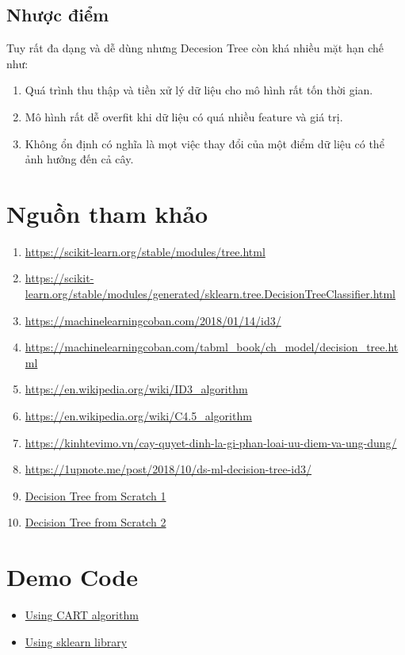 \documentclass[12pt, a4paper]{article}
\begin{document}
\subsection{Nhược điểm}
Tuy rất đa dạng và dễ dùng nhưng Decesion Tree còn khá nhiều mặt hạn chế như:
\begin{enumerate}
    \item Quá trình thu thập và tiền xử lý dữ liệu cho mô hình rất tốn thời gian.
    \item Mô hình rất dễ overfit khi dữ liệu có quá nhiều feature và giá trị.
    \item Không ổn định có nghĩa là mọt việc thay đổi của một điểm dữ liệu có thể ảnh hưởng đến cả cây.

\end{enumerate}
\newpage
\section*{Nguồn tham khảo}
\begin{enumerate}
    \item \url{https://scikit-learn.org/stable/modules/tree.html}
    \item \url{https://scikit-learn.org/stable/modules/generated/sklearn.tree.DecisionTreeClassifier.html}
    \item \url{https://machinelearningcoban.com/2018/01/14/id3/}
    \item \url{https://machinelearningcoban.com/tabml_book/ch_model/decision_tree.html}
    \item \url{https://en.wikipedia.org/wiki/ID3_algorithm}
    \item \url{https://en.wikipedia.org/wiki/C4.5_algorithm}
    \item \url{https://kinhtevimo.vn/cay-quyet-dinh-la-gi-phan-loai-uu-diem-va-ung-dung/}
    \item \url{https://1upnote.me/post/2018/10/ds-ml-decision-tree-id3/}
    \item \href{https://www.youtube.com/watch?v=jVh5NA9ERDA&list=PLqnslRFeH2Upcrywf-u2etjdxxkL8nl7E&index=8}{Decision Tree from Scratch 1}
    \item \href{https://www.youtube.com/watch?v=Bqi7EFFvNOg&list=PLqnslRFeH2Upcrywf-u2etjdxxkL8nl7E&index=9}{Decision Tree from Scratch 2}
\end{enumerate}
\section*{Demo Code}
\begin{itemize}
    \item \href{https://colab.research.google.com/drive/1J3sbA2uYNE9XxtMl7ncpVStYVoDf8Izb?usp=sharing}{Using CART algorithm}
    \item \href{https://colab.research.google.com/drive/11R9PA-roN8-FNO-1D62fZ2f7JaTlvQk5?usp=sharing}{Using sklearn library}
\end{itemize}
\end{document}
